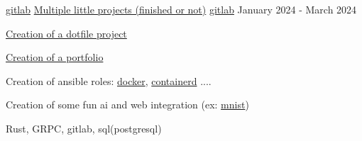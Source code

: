 \begin{cventries}
	\cventry
	{\href{https://gitlab.com/patchme/}{gitlab}} %
	{\href{https://gitlab.com/patchme/anything}{Multiple little projects (finished or not)}} %
	{\href{https://gitlab.com/patchme/anything}{gitlab}} %
	{January 2024 - March 2024} %
	{
		\begin{cvitems} %
            \item {\href{https://gitlab.com/patchme/dotfiles}{Creation of a dotfile project}}
            \item {\href{https://gitlab.com/Ripitchip/portfolio}{Creation of a portfolio}}
            \item {Creation of ansible roles: \href{https://gitlab.com/patchme/ansible-docker-offline}{docker}, \href{https://gitlab.com/patchme/ansible-role-containerd}{containerd} ....}
            \item {Creation of some fun ai and web integration (ex: \href{https://gitlab.com/Ripitchip/MNIST}{mnist})}
		\end{cvitems}
	}
	{
		\begin{cvitemsskills} %
			\item {Rust, GRPC, gitlab, sql(postgresql)}
		\end{cvitemsskills}
	}

\end{cventries}
